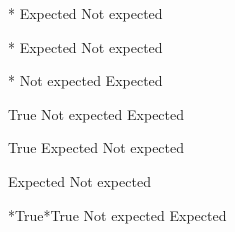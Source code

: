 \def\a{}
\def\b{**}
\def\c{True}

\if\a\b
Expected
\else
Not expected
\fi

\ifcat\a\b
Expected
\else
Not expected
\fi

\ifx\a\b
Not expected
\else
Expected
\fi

\if\c
Not expected
\else
Expected
\fi

\ifcat\c
Expected
\else
Not expected
\fi

\ifx\ifx\ifx
Expected
\else
Not expected
\fi

\if\ifx\a\b\c\else\if\a\b\c\fi\fi
Not expected
\else
Expected
\fi

\bye



